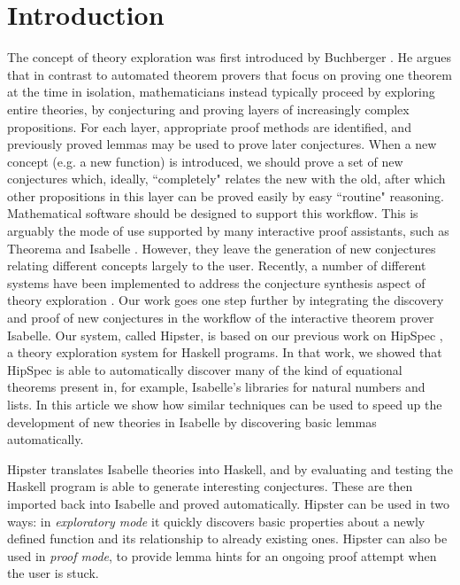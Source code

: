 \section{Introduction}
\label{sec:intro}
The concept of theory exploration was first introduced by Buchberger
\cite{buchberger2000theory}. He argues that in contrast to automated
theorem provers that focus on proving one theorem at the time in
isolation, mathematicians instead typically proceed by exploring
entire theories, by conjecturing and proving layers of increasingly
complex propositions. For each layer, appropriate proof methods are
identified, and previously proved lemmas may be used to prove later
conjectures. When a new concept (e.g. a new function) is introduced,
we should prove a set of new conjectures which, ideally, ``completely"
relates the new with the old, after which other propositions in this
layer can be proved easily by easy ``routine" reasoning. Mathematical
software should be designed to support this workflow. This is arguably
the mode of use supported by many interactive proof assistants, such
as Theorema \cite{theorema} and Isabelle \cite{isabelle}. However,
they leave the generation of new conjectures relating different
concepts largely to the user. Recently, a number of different systems
have been implemented to address the conjecture synthesis aspect of theory exploration
\cite{McCasland2006,isacosy,isascheme,hipspecCADE}. Our work goes one
step further by integrating the discovery and proof of new conjectures
in the workflow of the interactive theorem prover Isabelle. Our
system, called Hipster, is based on our previous work on HipSpec
\cite{hipspecCADE}, a theory exploration system for Haskell programs.
In that work, we showed that HipSpec is able to
automatically discover many of the kind of equational theorems present
in, for example, Isabelle's libraries for natural numbers and lists.
In this article we show how similar techniques can be used to speed up the
development of new theories in Isabelle by discovering basic lemmas
automatically.

Hipster translates Isabelle theories into Haskell, and by evaluating
and testing the Haskell program is able to generate interesting
conjectures. These are then
imported back into Isabelle and proved automatically. Hipster can be
used in two ways: in \emph{exploratory mode} it quickly discovers
basic properties about a newly defined function and its relationship
to already existing ones. Hipster can also be used in \emph{proof
  mode}, to provide lemma hints for an ongoing proof attempt when the
user is stuck.


